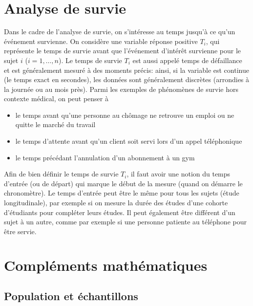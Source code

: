 \documentclass[
  11pt,
  letterpaper,
]{article}
\providecommand{\tightlist}{%
  \setlength{\itemsep}{0pt}\setlength{\parskip}{0pt}}
\theoremstyle{definition}
\theoremstyle{definition}
\theoremstyle{definition}
\theoremstyle{definition}
\theoremstyle{remark}
\begin{document}
\hypertarget{survie}{%
\section{Analyse de survie}\label{survie}}

Dans le cadre de l'analyse de survie, on s'intéresse au temps jusqu'à ce qu'un événement survienne. On considère une variable réponse positive \(T_i\), qui représente le temps de survie avant que l'événement d'intérêt survienne pour le sujet \(i\) (\(i=1, \ldots, n\)). Le temps de survie \(T_i\) est aussi appelé temps de défaillance et est généralement mesuré à des moments précis: ainsi, si la variable est continue (le temps exact en secondes), les données sont généralement discrètes (arrondies à la journée ou au mois près).
Parmi les exemples de phénomènes de survie hors contexte médical, on peut penser à

\begin{itemize}
\tightlist
\item
  le temps avant qu'une personne au chômage ne retrouve un emploi ou ne quitte le marché du travail
\item
  le temps d'attente avant qu'un client soit servi lors d'un appel téléphonique
\item
  le temps précédant l'annulation d'un abonnement à un gym
\end{itemize}

Afin de bien définir le temps de survie \(T_i\), il faut avoir une notion du temps d'entrée (ou de départ) qui marque le début de la mesure (quand on démarre le chronomètre). Le temps d'entrée peut être le même pour tous les sujets (étude longitudinale), par exemple si on mesure la durée des études d'une cohorte d'étudiants pour compléter leurs études. Il peut également être différent d'un sujet à un autre, comme par exemple si une personne patiente au téléphone pour être servie.

\hypertarget{appendix-annexe}{%
\appendix}


\hypertarget{complement}{%
\section{Compléments mathématiques}\label{complement}}

\hypertarget{population-echantillon}{%
\subsection{Population et échantillons}\label{population-echantillon}}
\end{document}

